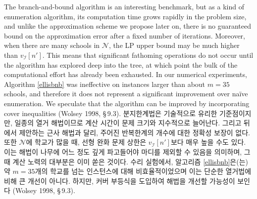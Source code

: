 \documentclass[11pt]{article} %
\theoremstyle{definition}
\theoremstyle{definition}
\begin{document}
\ifen
The branch-and-bound algorithm is an interesting benchmark, but as a kind of enumeration algorithm, its computation time grows rapidly in the problem size, and unlike the approximation scheme we propose later on, there is no guaranteed bound on the approximation error after a fixed number of iterations. Moreover, when there are many schools in $\mathcal{N}$, the LP upper bound may be much higher than $v_{\mathcal{I}}[n']$. This means that significant fathoming operations do not occur until the algorithm has explored deep into the tree, at which point the bulk of the computational effort has already been exhausted. In our numerical experiments, Algorithm \ref{ellisbnb} was ineffective on instances larger than about $m=35$ schools, and therefore it does not represent a significant improvement over na\"ive enumeration. We speculate that the algorithm can be improved by incorporating cover inequalities (Wolsey 1998, \S\,9.3).  
\else
분지한계법은 기술적으로 유리한 기준점이지만, 일종의 열거 해법이므로 계산 시간이 문제 크기와 지수적으로 늘어난다. 그리고 뒤에서 제안하는 근사 해법과 달리, 주어진 반복한계의 개수에 대한 정확성 보장이 없다. 또한 $\mathcal{N}$에 학교가 많을 때, 선형 완화 문제 상한은 $v_{\mathcal{I}}[n']$보다 매우 높을 수도 있다. 이는 해법이 나무에 어느 정도 깊게 파고들어야 마디를 제외할 수 있음을 의미하며, 그때 계산 노력의 대부분은 이미 쏟은 것이다. 수리 실험에서, 알고리즘 \ref{ellisbnb}은(는) 약 $m=35$개의 학교를 넘는 인스턴스에 대해 비효율적이었으며 이는 단순한 열거법에 비해 큰 개선이 아니다. 하지만, 커버 부등식을 도입하여 해법을 개선할 가능성이 보인다 (Wolsey 1998, \S\,9.3).
\fi
\end{document}
